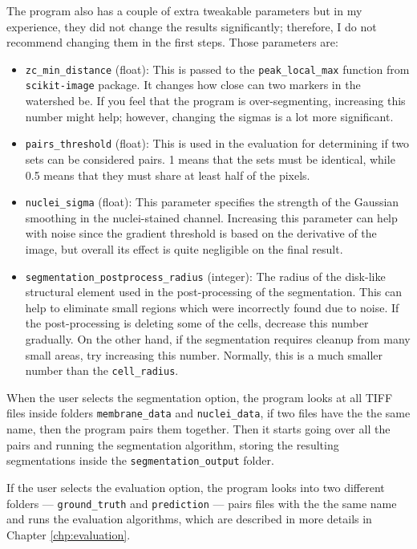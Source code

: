 \documentclass[
  digital,     %
  oneside,     %
  nosansbold,  %
  nocolorbold, %
  lof,         %
  lot,         %
]{fithesis4}
\begin{document}
The program also has a couple of extra tweakable parameters but in my experience,
they did not change the results significantly; therefore, I do not recommend
changing them in the first steps. Those parameters are:
\begin{itemize}
    \item \texttt{zc\_min\_distance} (float): This is passed to the
        \texttt{peak\_local\_max} function from \texttt{scikit-image} package.
        It changes how close can two markers in the watershed be. If you feel
        that the program is over-segmenting, increasing this number might help;
        however, changing the sigmas is a lot more significant.
    \item \texttt{pairs\_threshold} (float): This is used in the evaluation for
        determining if two sets can be considered pairs. 1 means that the sets
        must be identical, while 0.5 means that they must share at least half of
        the pixels.
    \item \texttt{nuclei\_sigma} (float): This parameter specifies the strength
        of the Gaussian smoothing in the nuclei-stained channel. Increasing this
        parameter can help with noise since the gradient threshold is based on the
        derivative of the image, but overall its effect is quite negligible on the
        final result.
    \item \texttt{segmentation\_postprocess\_radius} (integer): The radius of the
        disk-like structural element used in the post-processing of the
        segmentation. This can help to eliminate small regions which were
        incorrectly found due to noise. If the post-processing is deleting some of 
        the cells, decrease this number gradually. On the other hand, if the segmentation
        requires cleanup from many small areas, try increasing this number. Normally,
        this is a much smaller number than the \texttt{cell\_radius}.
\end{itemize}

When the user selects the segmentation option, the program looks at all TIFF
files inside folders \texttt{membrane\_data} and \texttt{nuclei\_data}, if two files have the
the same name, then the program pairs them together. Then it starts going over all
the pairs and running the segmentation algorithm, storing the resulting
segmentations inside the \texttt{segmentation\_output} folder.

If the user selects the evaluation option, the program looks into two different
folders --- \texttt{ground\_truth} and \texttt{prediction} --- pairs files with the
the same name and runs the evaluation algorithms, which are described in more
details in Chapter \ref{chp:evaluation}.
\end{document}
